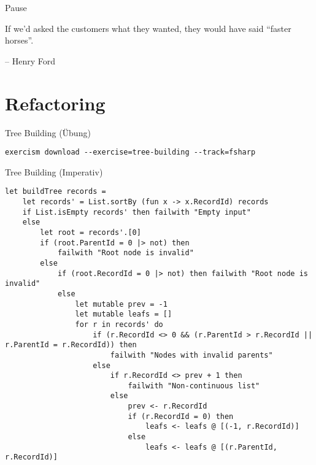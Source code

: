 \documentclass[t]{beamer}
\begin{document}
\begin{frame}[label={sec:org9ebcaca}]{Pause}
\begin{block}{}
If we’d asked the customers what they wanted, they would have said “faster horses”.

\null\hfill -- Henry Ford
\end{block}
\end{frame}

\section{Refactoring }
\label{sec:org8663846}
\begin{frame}[label={sec:org5554b04},fragile]{Tree Building (Übung)}
 \begin{verbatim}
exercism download --exercise=tree-building --track=fsharp
\end{verbatim}
\end{frame}

\begin{frame}[label={sec:orgcdaff49},fragile]{Tree Building (Imperativ)}
 \begin{verbatim}
let buildTree records =
    let records' = List.sortBy (fun x -> x.RecordId) records
    if List.isEmpty records' then failwith "Empty input"
    else
        let root = records'.[0]
        if (root.ParentId = 0 |> not) then
            failwith "Root node is invalid"
        else
            if (root.RecordId = 0 |> not) then failwith "Root node is invalid"
            else
                let mutable prev = -1
                let mutable leafs = []
                for r in records' do
                    if (r.RecordId <> 0 && (r.ParentId > r.RecordId || r.ParentId = r.RecordId)) then
                        failwith "Nodes with invalid parents"
                    else
                        if r.RecordId <> prev + 1 then
                            failwith "Non-continuous list"
                        else
                            prev <- r.RecordId
                            if (r.RecordId = 0) then
                                leafs <- leafs @ [(-1, r.RecordId)]
                            else
                                leafs <- leafs @ [(r.ParentId, r.RecordId)]
\end{verbatim}
\end{frame}
\end{document}
